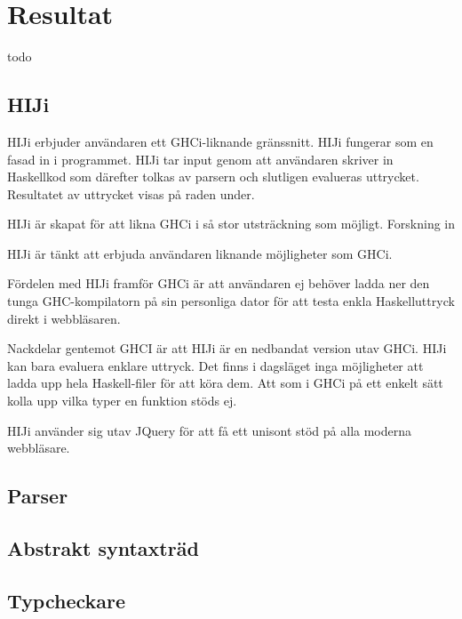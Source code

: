 \section{Resultat}
todo

\subsection{HIJi} 
HIJi erbjuder användaren ett GHCi-liknande gränssnitt. HIJi fungerar som en fasad in i programmet. 
HIJi tar input genom att användaren skriver in Haskellkod som därefter tolkas av parsern och slutligen evalueras uttrycket. Resultatet av uttrycket visas på raden under.

HIJi är skapat för att likna GHCi i så stor utsträckning som möjligt. Forskning in

HIJi är tänkt att erbjuda användaren liknande möjligheter som GHCi. 

Fördelen med HIJi framför GHCi är att användaren ej behöver ladda ner den tunga GHC-kompilatorn på sin personliga dator för att testa enkla Haskelluttryck direkt i webbläsaren.

Nackdelar gentemot GHCI är att HIJi är en nedbandat version utav GHCi. HIJi kan bara evaluera enklare uttryck. Det finns i dagsläget inga möjligheter att ladda upp hela Haskell-filer för att köra dem. Att som i GHCi på ett enkelt sätt kolla upp vilka typer en funktion stöds ej.

HIJi använder sig utav JQuery för att få ett unisont stöd på alla moderna webbläsare.


\subsection{Parser} 

\subsection{Abstrakt syntaxträd} 

\subsection{Typcheckare} 
